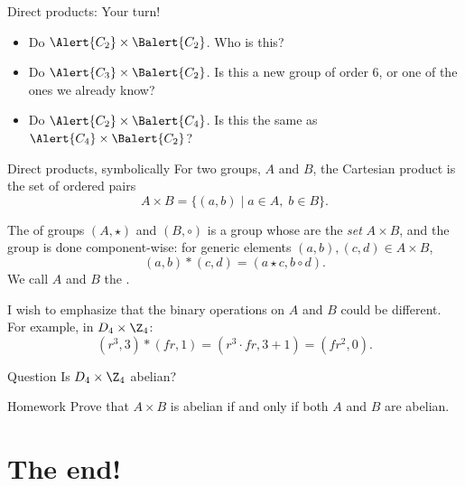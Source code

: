 \documentclass[8pt, handout]{beamer}
\newcommand{\Pause}{}      %
\begin{document}

\begin{frame}{Direct products: Your turn!}
  \begin{itemize}
    \item Do $\Alert{C_2}\times\Balert{C_2}$. Who is this? \Pause
    \item Do $\Alert{C_3}\times\Balert{C_2}$. Is this a new group of order 6, or one of the ones we already know? \Pause
    \item Do $\Alert{C_2}\times\Balert{C_4}$. Is this the same as $\Alert{C_4}\times\Balert{C_2}$?
  \end{itemize}
\end{frame}


\begin{frame}{Direct products, symbolically}
  For two groups, $A$ and $B$, the Cartesian product is the set of ordered pairs
  \[
  A\times B=\big\{(a,b)\mid a\in A,\;b\in B\big\}.
  \]
  
  \vspace{-2mm}\Pause
  
  \begin{definition}
    The  of groups $(A,\star)$ and $(B, \circ)$ is a group whose  are the \emph{set} $A\times B$, 
    and the group  is done component-wise: \Pause 
    for generic elements $(a,b),(c,d)\in A\times B$,
    \[
    (a,b)*(c,d)=(a\star c,b\circ d).
    \]
    \Pause We call $A$ and $B$ the .
  \end{definition}
  
  \smallskip\Pause
  
  I wish to emphasize that the binary operations on $A$ and $B$ could be different. \Pause 
  For example, in $D_4\times\Z_4$:
  \[
  (r^3,3)*(fr,1)=(r^3\cdot fr,3+1)\Pause=(fr^2,0). 
  \]

  \begin{alertblock}{Question}
    Is $D_4\times \Z_4$ abelian?
  \end{alertblock} \Pause
  \begin{exampleblock}{Homework}
    Prove that $A\times B$ is abelian \alert{if and only if} both $A$ and $B$ are abelian.
  \end{exampleblock}
  
\end{frame}

\section{The end!}
\end{document}
